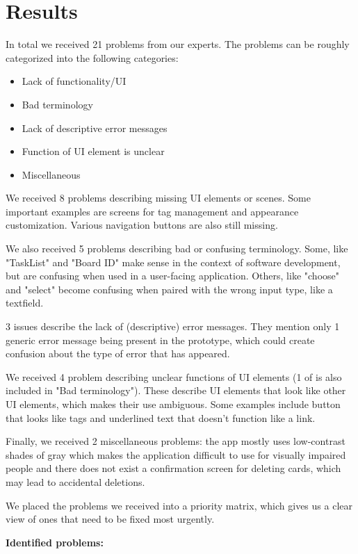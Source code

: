 \newpage
\section{Results}
In total we received 21 problems from our experts. The problems can be roughly categorized into the following categories:
\begin{itemize}
    \item Lack of functionality/UI
    \item Bad terminology
    \item Lack of descriptive error messages
    \item Function of UI element is unclear
    \item Miscellaneous
\end{itemize}
We received 8 problems describing missing UI elements or scenes. Some important examples are screens for tag management and appearance customization. Various navigation buttons are also still missing.

We also received 5 problems describing bad or confusing terminology. Some, like "TaskList" and "Board ID" make sense in the context of software development, but are confusing when used in a user-facing application. Others, like "choose" and "select" become confusing when paired with the wrong input type, like a textfield.

3 issues describe the lack of (descriptive) error messages. They mention only 1 generic error message being present in the prototype, which could create confusion about the type of error that has appeared.

We received 4 problem describing unclear functions of UI elements (1 of is also included in "Bad terminology"). These describe UI elements that look like other UI elements, which makes their use ambiguous. Some examples include button that looks like tags and underlined text that doesn't function like a link.

Finally, we received 2 miscellaneous problems: the app mostly uses low-contrast shades of gray which makes the application difficult to use for visually impaired people and there does not exist a confirmation screen for deleting cards, which may lead to accidental deletions.


We placed the problems we received into a priority matrix, which gives us a clear view of ones that need to be fixed most urgently.

\textbf{Identified problems:}

